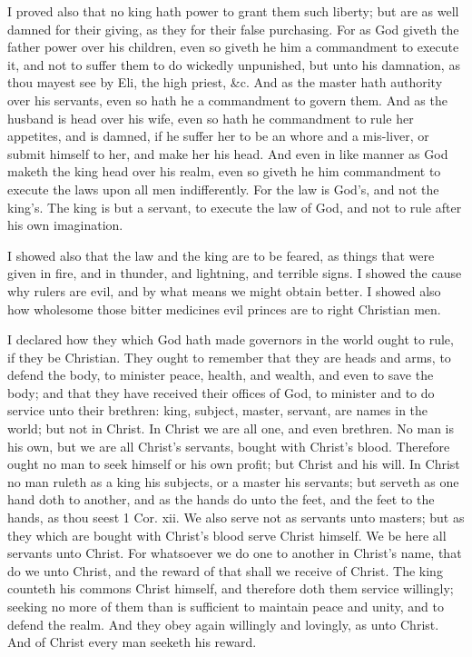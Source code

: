 I proved also that no king hath power to grant them 
such liberty; but are as well damned for their giving, as 
they for their false purchasing. For as God giveth the 
father power over his children, even so giveth he him a 
commandment to execute it, and not to suffer them to do 
wickedly unpunished, but unto his damnation, as thou mayest 
see by Eli, the high priest, \&c. And as the master hath 
authority over his servants, even so hath he a commandment 
to govern them. And as the husband is head over his wife, 
even so hath he commandment to rule her appetites, and is 
damned, if he suffer her to be an whore and a mis-liver, 
or submit himself to her, and make her his head. And
even in like manner as God maketh the king head over his
realm, even so giveth he him commandment to execute
the laws upon all men indifferently. For the law is God's,
and not the king's. The king is but a servant, to execute
the law of God, and not to rule after his own imagination. 

I showed also that the law and the king are to be 
feared, as things that were given in fire, and in thunder, 
and lightning, and terrible signs. I showed the cause why 
rulers are evil, and by what means we might obtain better. 
I showed also how wholesome those bitter medicines evil 
princes are to right Christian men. 

I declared how they which God hath made governors in 
the world ought to rule, if they be Christian. They 
ought to remember that they are heads and arms, to defend
the body, to minister peace, health, and wealth, and 
even to save the body; and that they have received their 
offices of God, to minister and to do service unto their 
brethren: king, subject, master, servant, are names in the 
world; but not in Christ. In Christ we are all one, and 
even brethren. No man is his own, but we are all 
Christ's servants, bought with Christ's blood. Therefore 
ought no man to seek himself or his own profit; but 
Christ and his will. In Christ no man ruleth as a king 
his subjects, or a master his servants; but serveth as one 
hand doth to another, and as the hands do unto the feet, 
and the feet to the hands, as thou seest 1 Cor. xii. We 
also serve not as servants unto masters; but as they which 
are bought with Christ's blood serve Christ himself. We 
be here all servants unto Christ. For whatsoever we do 
one to another in Christ's name, that do we unto Christ, 
and the reward of that shall we receive of Christ. The 
king counteth his commons Christ himself, and therefore 
doth them service willingly; seeking no more of them than 
is sufficient to maintain peace and unity, and to defend the 
realm. And they obey again willingly and lovingly, as 
unto Christ. And of Christ every man seeketh his reward. 

